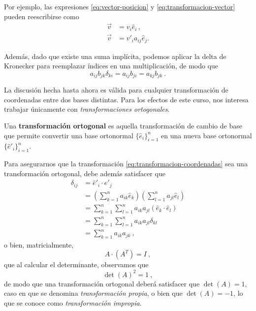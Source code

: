 Por ejemplo, las expresiones \eqref{eq:vector-posicion} y \eqref{eq:transformacion-vector} pueden reescribirse como
\begin{align}
    \vec{v} & = v_i \hat{e}_i \, , \\
    \vec{v} & = v'_i a_{ij} \hat{e}_j .
\end{align}

Además, dado que existe una suma implícita, podemos aplicar la delta de Kronecker para reemplazar índices en una multiplicación, de modo que
\begin{equation}
    a_{ij} b_{jk} \delta_{ki} = a_{ij} b_{ji} = a_{kj} b_{jk} \ .
\end{equation}


La discusión hecha hasta ahora es válida para cualquier transformación de coordenadas entre dos bases distintas. Para los efectos de este curso, nos interesa trabajar únicamente con \emph{transformaciones ortogonales}.

\begin{defi} 
    Una \textbf{transformación ortogonal} es aquella transformación de cambio de base que permite convertir una base ortonormal $\{\hat{e}_i\}_{i=1}^n$ en una nueva base ortonormal $\{\hat{e}'_i\}_{i=1}^n$.
\end{defi}

Para asegurarnos que la transformación \eqref{eq:transformacion-coordenadas} sea una transformación ortogonal, debe además satisfacer que
\begin{align}
    \delta_{ij} & = \hat{e}'_i \cdot \hat{e}'_j \\
    & = \left( \sum_{k=1}^n a_{ik} \hat{e}_k \right) \left( \sum_{l=1}^n a_{jl} \hat{e}_l \right) \\
    & = \sum_{k=1}^n \sum_{l=1}^n a_{ik} a_{jl} (\hat{e}_k \cdot \hat{e}_l) \\
    & = \sum_{k=1}^n \sum_{l=1}^n a_{ik} a_{jl} \delta_{kl} \\
    & = \sum_{k=1}^n a_{ik} a_{jk} \ , \label{eq:delta-transformacion-ortogonal}
\end{align}
o bien, matricialmente,
\begin{equation}\label{eq:condicion-matricial}
    A \cdot (A^T) = I \ ,
\end{equation}
que al calcular el determinante, observamos que
\begin{equation}
    \det(A)^2 = 1 \ , 
\end{equation}
de modo que una transformación ortogonal deberá satisfacer que $\det(A) = 1$, caso en que se denomina \emph{transformación propia}, o bien que $\det(A) = -1$, lo que se conoce como \emph{transformación impropia}.

